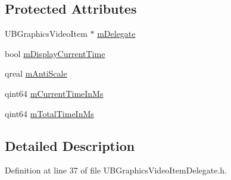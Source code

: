 \subsection*{Protected Attributes}
\begin{DoxyCompactItemize}
\item 
U\-B\-Graphics\-Video\-Item $\ast$ \hyperlink{class_delegate_video_control_a93305b12d3555c063827ca7913aaf9a2}{m\-Delegate}
\item 
bool \hyperlink{class_delegate_video_control_a203df9a0783f9b13b2dbeb3bd36e17c3}{m\-Display\-Current\-Time}
\item 
qreal \hyperlink{class_delegate_video_control_abae4f33c0fbaecbb4d8ac35fb2dfd3a3}{m\-Anti\-Scale}
\item 
qint64 \hyperlink{class_delegate_video_control_a7eef884befdaa42a32b7efd4fd350b3d}{m\-Current\-Time\-In\-Ms}
\item 
qint64 \hyperlink{class_delegate_video_control_aade232616040470361ef28f72e782f67}{m\-Total\-Time\-In\-Ms}
\end{DoxyCompactItemize}


\subsection{Detailed Description}


Definition at line 37 of file U\-B\-Graphics\-Video\-Item\-Delegate.\-h.



